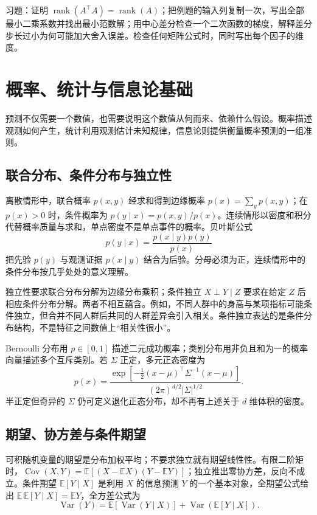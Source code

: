 \documentclass[UTF8,12pt,a4paper,fontset=fandol]{ctexbook}
\begin{document}
习题：证明 $\operatorname{rank}(A^\top A)=\operatorname{rank}(A)$；把例题的输入列复制一次，写出全部最小二乘系数并找出最小范数解；用中心差分检查一个二次函数的梯度，解释差分步长过小为何可能加大舍入误差。检查任何矩阵公式时，同时写出每个因子的维度。

\chapter{概率、统计与信息论基础}
\label{chap:ml-probability}

预测不仅需要一个数值，也需要说明这个数值从何而来、依赖什么假设。概率描述观测如何产生，统计利用观测估计未知规律，信息论则提供衡量概率预测的一组准则。

\section{联合分布、条件分布与独立性}

离散情形中，联合概率 $p(x,y)$ 经求和得到边缘概率 $p(x)=\sum_yp(x,y)$；在 $p(x)>0$ 时，条件概率为 $p(y\mid x)=p(x,y)/p(x)$。连续情形以密度和积分代替概率质量与求和，单点密度不是单点事件的概率。贝叶斯公式
\[
 p(y\mid x)=\frac{p(x\mid y)p(y)}{p(x)}
\]
把先验 $p(y)$ 与观测证据 $p(x\mid y)$ 结合为后验。分母必须为正，连续情形中的条件分布按几乎处处的意义理解。

独立性要求联合分布分解为边缘分布乘积；条件独立 $X\perp Y\mid Z$ 要求在给定 $Z$ 后相应条件分布分解。两者不相互蕴含。例如，不同人群中的身高与某项指标可能条件独立，但合并不同人群后共同的人群差异会引入相关。条件独立表达的是条件分布结构，不是特征之间数值上“相关性很小”。

Bernoulli 分布用 $p\in[0,1]$ 描述二元成功概率；类别分布用非负且和为一的概率向量描述多个互斥类别。若 $\Sigma$ 正定，多元正态密度为
\[
 p(x)=\frac{\exp[-\tfrac12(x-\mu)^\top\Sigma^{-1}(x-\mu)]}
 {(2\pi)^{d/2}|\Sigma|^{1/2}}.
\]
半正定但奇异的 $\Sigma$ 仍可定义退化正态分布，却不再有上述关于 $d$ 维体积的密度。

\section{期望、协方差与条件期望}

可积随机变量的期望是分布加权平均；不要求独立就有期望线性性。有限二阶矩时，$\operatorname{Cov}(X,Y)=\mathbb E[(X-\mathbb EX)(Y-\mathbb EY)]$；独立推出零协方差，反向不成立。条件期望 $\mathbb E[Y\mid X]$ 是利用 $X$ 的信息预测 $Y$ 的一个基本对象，全期望公式给出 $\mathbb E\,\mathbb E[Y\mid X]=\mathbb EY$，全方差公式为
\[
 \operatorname{Var}(Y)=\mathbb E[\operatorname{Var}(Y\mid X)]
 +\operatorname{Var}(\mathbb E[Y\mid X]).
\]
\end{document}
